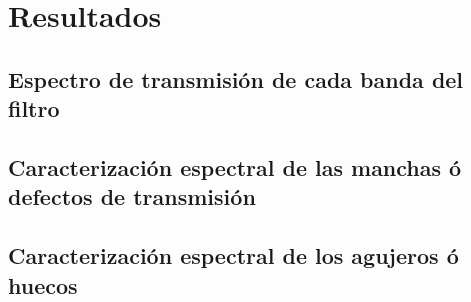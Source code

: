 \singlespacing
\section{Resultados}
\label{sec:resgrales}


\singlespacing
\subsection{Espectro de transmisión de cada banda del filtro}
\label{sec:espectransm}


\singlespacing
\subsection{Caracterización espectral de las manchas ó defectos de transmisión}
\label{sec:defctma}


\singlespacing
\subsection{Caracterización espectral de los agujeros ó huecos}
\label{sec:defctag}
